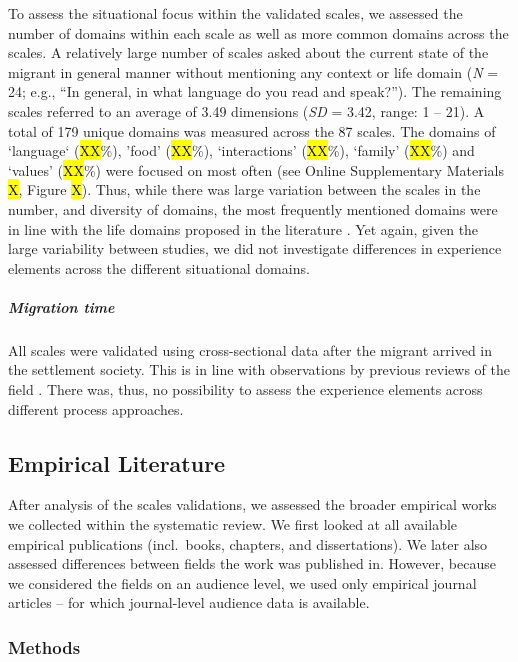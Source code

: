 To assess the situational focus within the validated scales, we assessed
the number of domains within each scale as well as more common domains
across the scales. A relatively large number of scales asked about the
current state of the migrant in general manner without mentioning any
context or life domain (\textit{N} = 24; e.g., ``In general, in what
language do you read and speak?''). The remaining scales referred to an
average of 3.49 dimensions (\textit{SD} = 3.42, range: 1 -- 21). A total
of 179 unique domains was measured across the 87 scales. The domains of
`language` (\hl{XX}\%), 'food' (\hl{XX}\%), `interactions' (\hl{XX}\%),
`family' (\hl{XX}\%) and `values' (\hl{XX}\%) were focused on most often
(see Online Supplementary Materials \hl{X}, Figure \hl{X}). Thus, while
there was large variation between the scales in the number, and
diversity of domains, the most frequently mentioned domains were in line
with the life domains proposed in the literature
\citep[e.g.,][]{Arends-Toth2007}. Yet again, given the large variability
between studies, we did not investigate differences in experience
elements across the different situational domains.

\subparagraph{Migration time}

All scales were validated using cross-sectional data after the migrant
arrived in the settlement society. This is in line with observations by
previous reviews of the field \citep[e.g.,][]{Brown2011}. There was,
thus, no possibility to assess the experience elements across different
process approaches.

\subsection{Empirical Literature}

After analysis of the scales validations, we assessed the broader
empirical works we collected within the systematic review. We first
looked at all available empirical publications (incl.~books, chapters,
and dissertations). We later also assessed differences between fields
the work was published in. However, because we considered the fields on
an audience level, we used only empirical journal articles -- for which
journal-level audience data is available.

\subsubsection{Methods}

